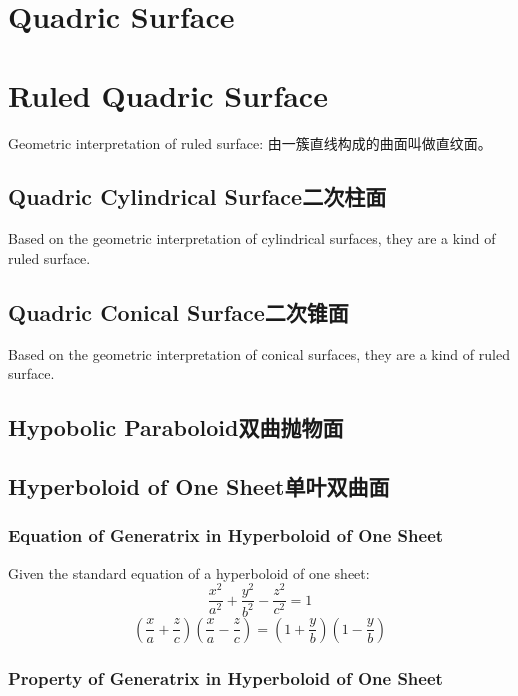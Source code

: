 \documentclass[onecolumn]{ctexart}
\begin{document}
\section{Quadric Surface}

\section{Ruled Quadric Surface}

Geometric interpretation of ruled surface: 由一簇直线构成的曲面叫做直纹面。

\subsection{Quadric Cylindrical Surface二次柱面}

Based on the geometric interpretation of cylindrical surfaces, they are a kind 
of ruled surface.

\subsection{Quadric Conical Surface二次锥面}

Based on the geometric interpretation of conical surfaces, they are a kind of 
ruled surface.

\subsection{Hypobolic Paraboloid双曲抛物面}

\subsection{Hyperboloid of One Sheet单叶双曲面}

\subsubsection{Equation of Generatrix in Hyperboloid of One Sheet}

Given the standard equation of a hyperboloid of one sheet:
\begin{equation}
  \frac{x^2}{a^2} + \frac{y^2}{b^2} - \frac{z^2}{c^2} = 1
\end{equation}
\begin{equation}
  (\frac{x}{a} + \frac{z}{c})(\frac{x}{a} - \frac{z}{c}) = (1 + \frac{y}{b})(1 - \frac{y}{b})
\end{equation}

\subsubsection{Property of Generatrix in Hyperboloid of One Sheet}
\end{document}
